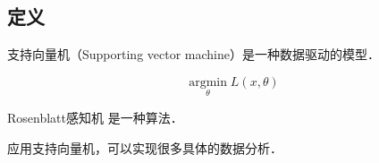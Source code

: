 
\subsection{定义}

支持向量机（Supporting vector machine）是一种数据驱动的模型．

\begin{equation}
\mathop{\arg\min}\limits_{\theta} L(x,\theta)
\end{equation}

\begin{definition}{Rosenblatt感知机}
是一种算法．
\end{definition}

应用支持向量机，可以实现很多具体的数据分析．